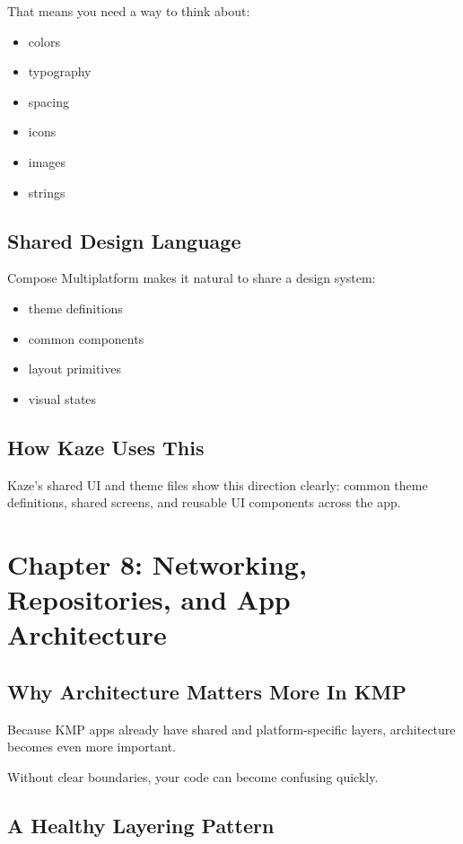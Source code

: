 \documentclass[11pt,a4paper]{article}
\begin{document}
That means you need a way to think about:
\begin{itemize}
    \item colors
    \item typography
    \item spacing
    \item icons
    \item images
    \item strings
\end{itemize}

\subsection{Shared Design Language}

Compose Multiplatform makes it natural to share a design system:
\begin{itemize}
    \item theme definitions
    \item common components
    \item layout primitives
    \item visual states
\end{itemize}

\subsection{How Kaze Uses This}

Kaze's shared UI and theme files show this direction clearly: common theme definitions, shared screens, and reusable UI components across the app.

\section{Chapter 8: Networking, Repositories, and App Architecture}

\subsection{Why Architecture Matters More In KMP}

Because KMP apps already have shared and platform-specific layers, architecture becomes even more important.

Without clear boundaries, your code can become confusing quickly.

\subsection{A Healthy Layering Pattern}
\end{document}
